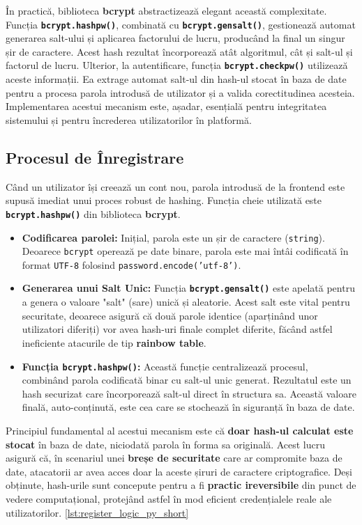 \documentclass[12pt, a4paper, oneside, romanian]{teza-upb}
\begin{document}
În practică, biblioteca \textbf{bcrypt} abstractizează elegant această complexitate. Funcția \textbf{\texttt{bcrypt.hashpw()}}, combinată cu \textbf{\texttt{bcrypt.gensalt()}}, gestionează automat generarea salt-ului și aplicarea factorului de lucru, producând la final un singur șir de caractere. Acest hash rezultat încorporează atât algoritmul, cât și salt-ul și factorul de lucru. Ulterior, la autentificare, funcția \textbf{\texttt{bcrypt.checkpw()}} utilizează aceste informații. Ea extrage automat salt-ul din hash-ul stocat în baza de date pentru a procesa parola introdusă de utilizator și a valida corectitudinea acesteia. Implementarea acestui mecanism este, așadar, esențială pentru integritatea sistemului și pentru încrederea utilizatorilor în platformă.


\subsection*{Procesul de Înregistrare}
Când un utilizator își creează un cont nou, parola introdusă de la frontend este supusă imediat unui proces robust de hashing. Funcția cheie utilizată este \textbf{\texttt{bcrypt.hashpw()}} din biblioteca \textbf{bcrypt}.

\begin{itemize}
	\item \textbf{Codificarea parolei:} Inițial, parola este un șir de caractere (\texttt{string}). Deoarece \texttt{bcrypt} operează pe date binare, parola este mai întâi codificată în format \texttt{UTF-8} folosind \texttt{password.encode('utf-8')}.
	
	\item \textbf{Generarea unui Salt Unic:} Funcția \textbf{\texttt{bcrypt.gensalt()}} este apelată pentru a genera o valoare "salt" (sare) unică și aleatorie. Acest salt este vital pentru securitate, deoarece asigură că două parole identice (aparținând unor utilizatori diferiți) vor avea hash-uri finale complet diferite, făcând astfel ineficiente atacurile de tip \textbf{rainbow table}.
	
	\item \textbf{Funcția \texttt{bcrypt.hashpw()}:} Această funcție centralizează procesul, combinând parola codificată binar cu salt-ul unic generat. Rezultatul este un hash securizat care încorporează salt-ul direct în structura sa. Această valoare finală, auto-conținută, este cea care se stochează în siguranță în baza de date.
\end{itemize}

Principiul fundamental al acestui mecanism este că \textbf{doar hash-ul calculat este stocat} în baza de date, niciodată parola în forma sa originală. Acest lucru asigură că, în scenariul unei \textbf{breșe de securitate} care ar compromite baza de date, atacatorii ar avea acces doar la aceste șiruri de caractere criptografice. Deși obținute, hash-urile sunt concepute pentru a fi \textbf{practic ireversibile} din punct de vedere computațional, protejând astfel în mod eficient credențialele reale ale utilizatorilor. \ref {lst:register_logic_py_short}
\end{document}

